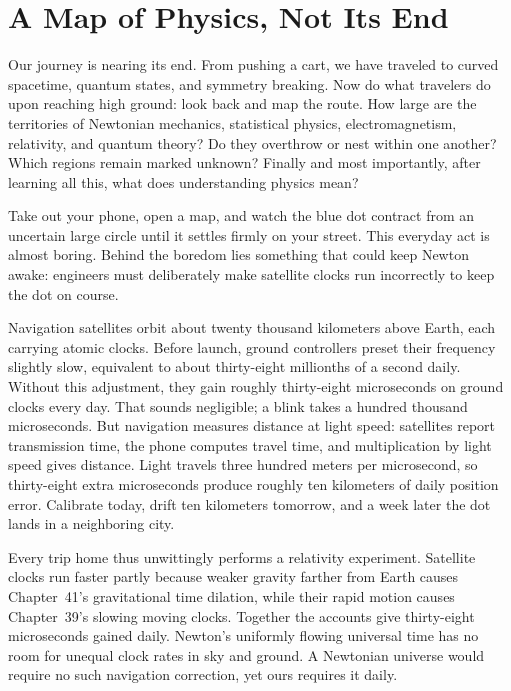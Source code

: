 \chapter{A Map of Physics, Not Its End}

Our journey is nearing its end. From pushing a cart, we have traveled to curved spacetime, quantum states, and symmetry breaking. Now do what travelers do upon reaching high ground: look back and map the route. How large are the territories of Newtonian mechanics, statistical physics, electromagnetism, relativity, and quantum theory? Do they overthrow or nest within one another? Which regions remain marked unknown? Finally and most importantly, after learning all this, what does understanding physics mean?


Take out your phone, open a map, and watch the blue dot contract from an uncertain large circle until it settles firmly on your street. This everyday act is almost boring. Behind the boredom lies something that could keep Newton awake: engineers must deliberately make satellite clocks run incorrectly to keep the dot on course.

Navigation satellites orbit about twenty thousand kilometers above Earth, each carrying atomic clocks. Before launch, ground controllers preset their frequency slightly slow, equivalent to about thirty-eight millionths of a second daily. Without this adjustment, they gain roughly thirty-eight microseconds on ground clocks every day. That sounds negligible; a blink takes a hundred thousand microseconds. But navigation measures distance at light speed: satellites report transmission time, the phone computes travel time, and multiplication by light speed gives distance. Light travels three hundred meters per microsecond, so thirty-eight extra microseconds produce roughly ten kilometers of daily position error. Calibrate today, drift ten kilometers tomorrow, and a week later the dot lands in a neighboring city.

Every trip home thus unwittingly performs a relativity experiment. Satellite clocks run faster partly because weaker gravity farther from Earth causes Chapter~41's gravitational time dilation, while their rapid motion causes Chapter~39's slowing moving clocks. Together the accounts give thirty-eight microseconds gained daily. Newton's uniformly flowing universal time has no room for unequal clock rates in sky and ground. A Newtonian universe would require no such navigation correction, yet ours requires it daily.

